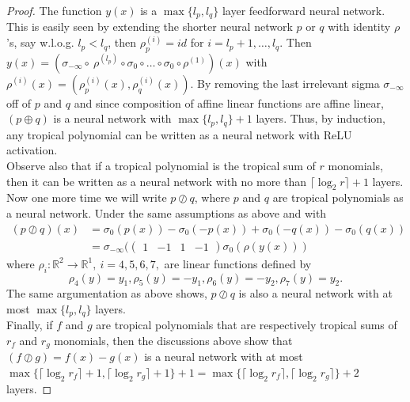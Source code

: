 \documentclass{article}
\theoremstyle{definition}
\begin{document}
\begin{proof}
The function $y(x)$ is a $\max \{ l_{p}, l_{q} \}$ layer feedforward neural network. This is easily seen by extending the shorter neural network $p$ or $q$ with identity $\rho$'s, say w.l.o.g. $l_{p} < l_{q}$, then $\rho^{(i)}_{p} = id$ for $i = l_{p} + 1, \dots , l_{q}$. Then $y(x)=(\sigma_{- \infty} \circ \ \rho^{(l_{p})} \circ \sigma_{0} \circ \dots \circ \sigma_{0} \circ \rho^{(1)})(x)$ with $\rho^{(i)}(x) = (\rho_{p}^{(i)}(x), \rho_{q}^{(i)}(x))$.
By removing the last irrelevant sigma $\sigma_{- \infty}$ off of $p$ and $q$ and since composition of affine linear functions are affine linear, $(p\oplus q)$ is a neural network with $\max \{ l_{p}, l_{q} \} + 1$ layers. Thus, by induction, any tropical polynomial can be written as a neural network with ReLU activation. \\
Observe also that if a tropical polynomial is the tropical sum of $r$ monomials, then it can be written as a neural network with no more than
$\lceil \log_{2} r \rceil + 1$ layers. Now one more time we will write $p \oslash q$, where $p$ and $q$ are tropical polynomials as a neural network. Under the same assumptions as above and with
\begin{align*}
(p \oslash q)(x)
&= \sigma_{0}(p(x)) - \sigma_{0}(-p(x)) + \sigma_{0}(-q(x)) - \sigma_{0}(q(x)) \\
&= \sigma_{- \infty }(\begin{pmatrix} 1 & -1 & 1 & -1 \end{pmatrix} \sigma_{0}(\rho(y(x)))
\end{align*}
where $\rho_{i}:\mathbb{R}^{2} \to \mathbb{R}^{1}, \ i=4,5,6,7,$ are linear functions defined by
$$\rho_{4}(y)=y_{1}, \rho_{5}(y)=-y_{1}, \rho_{6}(y)=-y_{2}, \rho_{7}(y)=y_{2}.$$
The same argumentation as above shows, $p \oslash q$ is also a neural network with at most $\max \{ l_{p}, l_{q} \}$ layers. \\
Finally, if $f$ and $g$ are tropical polynomials that are respectively tropical sums of $r_{f}$ and $r_{g}$ monomials, then the discussions
above show that $(f \oslash g) = f(x) - g(x)$ is a neural network with at most $\max \{ \lceil \log_{2}r_{f} \rceil + 1, \lceil \log_{2}r_g \rceil + 1 \} + 1 = \max \{ \lceil \log_{2}r_{f} \rceil, \lceil \log_{2}r_g \rceil \} + 2$ layers.
\end{proof}
\end{document}

